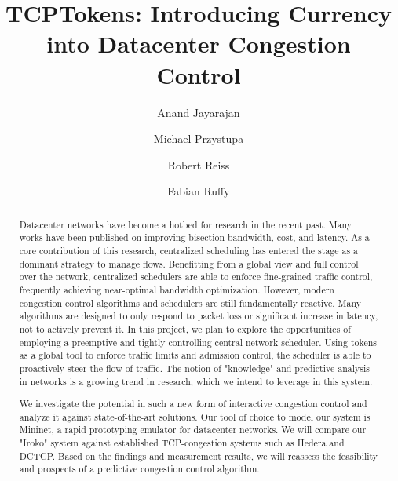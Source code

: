 \documentclass[sigconf]{acmart}
\begin{document}
\title{TCPTokens: Introducing Currency into Datacenter Congestion Control}

\author{Anand Jayarajan}

\author{Michael Przystupa}

\author{Robert Reiss}

\author{Fabian Ruffy}

\begin{abstract}
Datacenter networks have become a hotbed for research in the recent past. Many works have been published on improving bisection bandwidth, cost, and latency. As a core contribution of this research, centralized scheduling has entered the stage as a dominant strategy to manage flows. Benefitting from a global view and full control over the network, centralized schedulers are able to enforce fine-grained traffic control, frequently achieving near-optimal bandwidth optimization. However, modern congestion control algorithms and schedulers are still fundamentally reactive. Many algorithms are designed to only respond to packet loss or significant increase in latency, not to actively prevent it.
In this project, we plan to explore the opportunities of employing a preemptive and tightly controlling central network scheduler. Using tokens as a global tool to enforce traffic limits and admission control, the scheduler is able to proactively steer the flow of traffic. The notion of "knowledge" and predictive analysis in networks is a growing trend in research, which we intend to leverage in this system.

We investigate the potential in such a new form of interactive congestion control and analyze it against state-of-the-art solutions. Our tool of choice to model our system is Mininet, a rapid prototyping emulator for datacenter networks. We will compare our "Iroko" system against established TCP-congestion systems such as Hedera and DCTCP. Based on the findings and measurement results, we will reassess the feasibility and prospects of a predictive congestion control algorithm.
\end{abstract}





\maketitle


%





 
\end{document}
